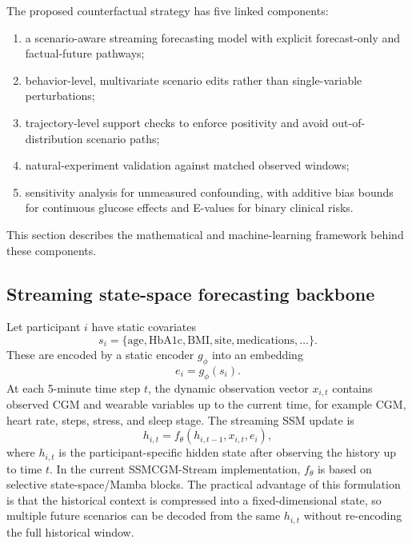 The proposed counterfactual strategy has five linked components:
\begin{enumerate}
    \item a scenario-aware streaming forecasting model with explicit forecast-only and factual-future pathways;
    \item behavior-level, multivariate scenario edits rather than single-variable perturbations;
    \item trajectory-level support checks to enforce positivity and avoid out-of-distribution scenario paths;
    \item natural-experiment validation against matched observed windows;
    \item sensitivity analysis for unmeasured confounding, with additive bias bounds for continuous glucose effects and E-values for binary clinical risks.
\end{enumerate}
This section describes the mathematical and machine-learning framework behind these components.

\subsection{Streaming state-space forecasting backbone}
\label{subsec:cf_backbone}

Let participant $i$ have static covariates
\begin{equation}
    s_i = \{\mathrm{age}, \mathrm{HbA1c}, \mathrm{BMI}, \mathrm{site}, \mathrm{medications}, \ldots\}.
\end{equation}
These are encoded by a static encoder $g_\phi$ into an embedding
\begin{equation}
    e_i = g_\phi(s_i).
\end{equation}
At each 5-minute time step $t$, the dynamic observation vector $x_{i,t}$ contains observed CGM and wearable variables up to the current time, for example CGM, heart rate, steps, stress, and sleep stage. The streaming SSM update is
\begin{equation}
    h_{i,t} = f_\theta(h_{i,t-1}, x_{i,t}, e_i),
    \label{eq:stream_update}
\end{equation}
where $h_{i,t}$ is the participant-specific hidden state after observing the history up to time $t$. In the current SSMCGM-Stream implementation, $f_\theta$ is based on selective state-space/Mamba blocks. The practical advantage of this formulation is that the historical context is compressed into a fixed-dimensional state, so multiple future scenarios can be decoded from the same $h_{i,t}$ without re-encoding the full historical window.

